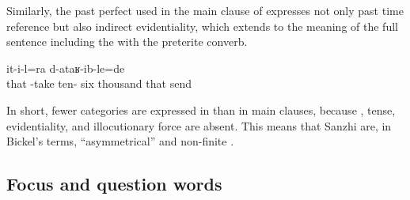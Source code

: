 Similarly, the past perfect used in the main clause of  expresses not only past time reference but also indirect evidentiality, which extends to the meaning of the full sentence including the  with the preterite converb.
%
\begin{exe}
	\ex	\label{ex:From her (he) took 16 000, and he sent (that money to us)}
		it-i-l=ra d-ataʁ-ib-le=de\\
		that	-take	ten-	six	thousand that	send\\
	\glt	{}
\end{exe}

In short, fewer categories are expressed in  than in main clauses, because , tense, evidentiality, and illocutionary force are absent. This means that Sanzhi  are, in Bickel's terms, ``asymmetrical'' and non-finite \citep{Bickel2010}. 



\subsection{Focus and question words}
\label{ssec:Focus and question words}


